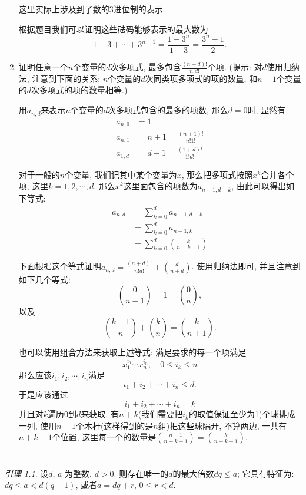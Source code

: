 \documentclass[12pt,a4paper]{book} %
\theoremstyle{remark}
\theoremstyle{example}
\theoremstyle{lemma}
\newtheorem{lemma}[theorem]{引理}
\theoremstyle{corollary}
\numberwithin{theorem}{chapter}
\begin{document}
\begin{enumerate}
这里实际上涉及到了数的3进位制的表示.

根据题目我们可以证明这些砝码能够表示的最大数为
\[
1 + 3 + \cdots + 3^{n-1} = \frac{1 - 3^n}{1-3} = \frac{3^n - 1}{2}.
\]

\item 证明任意一个$n$个变量的$d$次多项式, 最多包含$\frac{(n+d)!}{n!d!}$个项. (提示: 对$d$使用归纳法, 注意到下面的关系: $n$个变量的$d$次同类项多项式的项的数量, 和$n - 1$个变量的$d$次多项式的项的数量相等.)

用$a_{n,d}$来表示$n$个变量的$d$次多项式包含的最多的项数, 那么$d = 0$时, 显然有
\[
\begin{aligned}
a_{n,0} &= 1 \\
a_{n,1} &= n + 1 = \frac{(n+1)!}{n!1!} \\
a_{1,d} &= d + 1 = \frac{(1 + d)!}{1!d!}
\end{aligned}
\]

对于一般的$n$个变量, 我们记其中某个变量为$x$, 那么把多项式按照$x^k$合并各个项, 这里$k=1,2,\cdots, d$. 那么$x^k$这里面包含的项数为$a_{n-1, d-k}$, 由此可以得出如下等式:
\[
\begin{aligned}
a_{n,d} &= \sum_{k=0}^{d}{a_{n-1, d-k}} \\
&= \sum_{k=0}^{d}{a_{n-1, k}} \\
&= \sum_{k=0}^{d}{\binom{k}{n+k-1}} 
\end{aligned}
\]

下面根据这个等式证明$a_{n,d} = \frac{(n+d)!}{n!d!} + \binom{d}{n+d}$. 使用归纳法即可, 并且注意到如下几个等式:
\[
\binom{0}{n-1} = 1 = \binom{0}{n},
\]
以及
\[
\binom{k-1}{n} + \binom{k}{n} = \binom{k}{n+1}.
\]

也可以使用组合方法来获取上述等式: 满足要求的每一个项满足
\[
x_1^{i_1} \cdots x_n^{i_n}, \quad 0 \le i_k \le n
\]
那么应该$i_1, i_2, \cdots, i_n$满足
\[
i_1 + i_2 + \cdots + i_n \le d.
\]
于是应该通过
\[
i_1 + i_2 + \cdots + i_n = k
\]
并且对$k$遍历$0$到$d$来获取. 有$n+k$(我们需要把$i_k$的取值保证至少为1)个球排成一列, 使用$n-1$个木杆(这样得到的是$n$组)把这些球隔开, 不算两边, 一共有$n+k-1$个位置, 这里每一个的数量是$\binom{n-1}{n+k-1} = \binom{k}{n+k-1}$.
\end{enumerate}

\chapter{} \label{chapter:2}
\begin{lemma}
设$d$, $a$ 为整数, $d > 0$. 则存在唯一的$d$的最大倍数$dq \le a$; 它具有特征为: $dq \le a < d(q + 1)$, 或者$a = dq + r$, $0 \le r < d$.
\end{lemma}
\end{document}
